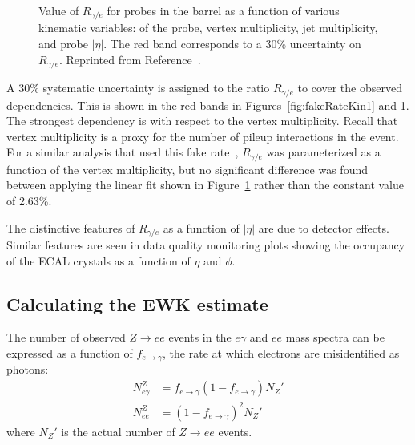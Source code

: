 \begin{figure}[h]
\begin{center}
\end{center}
\caption{Value of $R_{\gamma/e}$ for probes in the barrel as a function of various kinematic variables: \sigmaietaieta of the probe, 
vertex multiplicity, jet multiplicity, and probe $|\eta|$. The red band corresponds to a 30\% uncertainty 
on $R_{\gamma/e}$. Reprinted from Reference~\cite{KnutAN}.
}
\label{fig:fakeRateKin2}
\end{figure}

A 30\% systematic uncertainty is assigned to the ratio $R_{\gamma/e}$ to cover the observed dependencies. 
This is shown in the red bands in Figures~\ref{fig:fakeRateKin1} and \ref{fig:fakeRateKin2}. The strongest dependency is with respect
to the vertex multiplicity. Recall that vertex multiplicity is a proxy for the number of pileup interactions in the event. For a similar analysis that 
used this fake rate~\cite{PhotonHT}, $R_{\gamma/e}$ was parameterized as a function of the vertex multiplicity, but no significant difference was found between 
applying the linear fit shown in Figure~\ref{fig:fakeRateKin2} rather than the constant value of 2.63\%.

The distinctive features of $R_{\gamma/e}$ as a function of $|\eta|$ are due to detector effects. Similar features are seen in data quality monitoring plots showing the occupancy of the ECAL crystals as a function of $\eta$ and $\phi$. 


\subsection{Calculating the EWK estimate}
\label{sec:transfer}
The number of observed $Z\rightarrow ee$ events in the $e\gamma$ and $ee$ mass spectra can be expressed as a function of $f_{e\rightarrow\gamma}$, the rate at which electrons are misidentified as photons:
\begin{equation}
\begin{aligned}
\label{equ:fake}
N_{e\gamma}^Z &= f_{e\rightarrow\gamma}(1- f_{e\rightarrow\gamma})N_{Z}'\\
N_{ee}^Z &= (1-f_{e\rightarrow\gamma})^2N_{Z}'
\end{aligned}
\end{equation}
where $N_{Z}'$ is the actual number of $Z\rightarrow ee$ events. 


